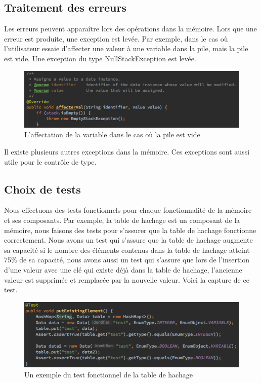 \documentclass[a4paper,12pt]{report}
\begin{document}
\subsection{Traitement des erreurs}
Les erreurs peuvent apparaître lors des opérations dans la mémoire. Lors que une erreur est produite, une exception est levée. Par exemple, dans le cas où l'utilisateur essaie d'affecter une valeur à une variable dans la pile, mais la pile est vide. Une exception du type NullStackException est levée.

\begin{figure}[H]
\begin{center}
	\includegraphics[scale=0.5]{affecterval}
	\caption{L'affectation de la variable dans le cas où la pile est vide}
\end{center}
\end{figure}

Il existe plusieurs autres exceptions dans la mémoire. Ces exceptions sont aussi utile pour le contrôle de type.

\subsection{Choix de tests}
Nous effectuons des tests fonctionnels pour chaque fonctionnalité de la mémoire et ses composants. Par exemple, la table de hachage est un composant de la mémoire, nous faisons des tests pour s'assurer que la table de hachage fonctionne correctement. Nous avons un test qui s'assure que la table de hachage augmente sa capacité si le nombre des éléments contenus dans la table de hachage atteint 75\% de sa capacité, nous avons aussi un test qui s'assure que lors de l'insertion d'une valeur avec une clé qui existe déjà dans la table de hachage, l'ancienne valeur est supprimée et remplacée par la nouvelle valeur. Voici la capture de ce test.

\begin{figure}[H]
\begin{center}
	\includegraphics[scale=0.5]{testexisting}
	\caption{Un exemple du test fonctionnel de la table de hachage}
\end{center}
\end{figure}
\end{document}
